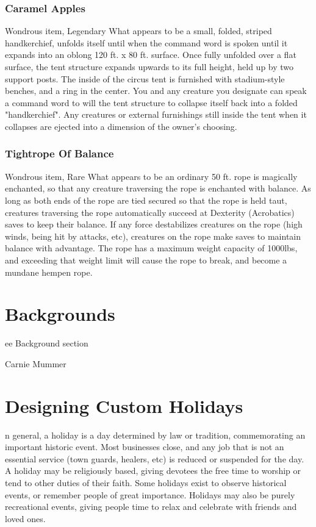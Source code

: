 \documentclass[10pt,a4paper,twoside,bg=print,twocolumn,openany,nodeprecatedcode]{dndbook}
\begin{document}
\subsection{Caramel Apples}
Wondrous item, Legendary
What appears to be a small, folded, striped handkerchief, unfolds itself until when the command word is spoken until it expands into an oblong 120 ft. x 80 ft. surface. Once fully unfolded over a flat surface, the tent structure expands upwards to its full height, held up by two support posts. The inside of the circus tent is furnished with stadium-style benches, and a ring in the center. You and any creature you designate can speak a command word to will the tent structure to collapse itself back into a folded "handkerchief". Any creatures or external furnishings still inside the tent when it collapses are ejected into a dimension of the owner's choosing.
\subsection{Tightrope Of Balance}
Wondrous item, Rare
What appears to be an ordinary 50 ft. rope is magically enchanted, so that any creature traversing the rope is enchanted with balance. As long as both ends of the rope are tied secured so that the rope is held taut, creatures traversing the rope automatically succeed at Dexterity (Acrobatics) saves to keep their balance. If any force destabilizes creatures on the rope (high winds, being hit by attacks, etc), creatures on the rope make saves to maintain balance with advantage. The rope has a maximum weight capacity of 1000lbs, and exceeding that weight limit will cause the rope to break, and become a mundane hempen rope.
\chapter{Backgrounds}
ee Background section

Carnie
Mummer
\chapter{Designing Custom Holidays}
n general, a holiday is a day determined by law or tradition, commemorating an important historic event. Most businesses close, and any job that is not an essential service (town guards, healers, etc) is reduced or suspended for the day. A holiday may be religiously based, giving devotees the free time to worship or tend to other duties of their faith. Some holidays exist to observe historical events, or remember people of great importance. Holidays may also be purely recreational events, giving people time to relax and celebrate with friends and loved ones.
\end{document}
